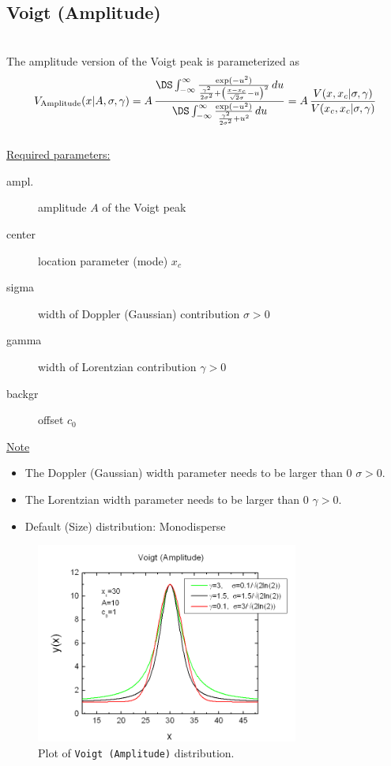 \clearpage
\subsection{Voigt (Amplitude)} ~\\[5mm]
\label{sec:VoigtAmplitude}
The amplitude version of the Voigt peak is parameterized as
\begin{equation}
V_\text{Amplitude}(x\vert A,\sigma,\gamma)
= A \, \frac{\DS \int_{-\infty}^\infty \frac{\exp(-u^2)}{\frac{\gamma^2}{2\sigma^2}+\left( \frac{x-x_c}{\sqrt{2}\sigma}-u\right)^2} \, du}{\DS \int_{-\infty}^\infty \frac{\exp(-u^2)}{\frac{\gamma^2}{2\sigma^2}+u^2}\, du}
= A \, \frac{V(x,x_c\vert\sigma,\gamma)}{V(x_c,x_c\vert\sigma,\gamma)}
\end{equation}
~\\

\underline{Required parameters:}
\begin{description}
    \item[ampl.] amplitude $A$ of the Voigt peak
    \item[center] location parameter (mode) $x_c$
    \item[sigma] width of Doppler (Gaussian) contribution $\sigma>0$
    \item[gamma] width of Lorentzian contribution $\gamma>0$
    \item[backgr] offset $c_0$
\end{description}

\underline{Note}
\begin{itemize}
  \item The Doppler (Gaussian) width parameter needs to be larger than 0 $\sigma>0$.
  \item The Lorentzian width parameter needs to be larger than 0 $\gamma>0$.
  \item Default (Size) distribution: Monodisperse
\end{itemize}


\begin{figure}[htb]
\begin{center}
\includegraphics[width=0.768\textwidth]{VoigtAmplitude.png}
\end{center}
\caption{Plot of \texttt{Voigt (Amplitude)} distribution.}
\label{fig:VoigtAmplitude}
\end{figure}


